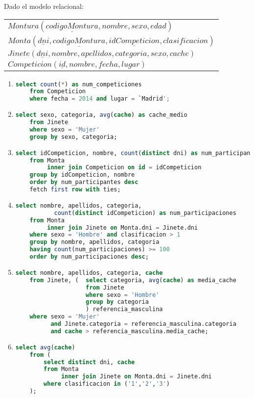 Dado el modelo relacional:
\begin{center}
	\begin{tabular}{l}
		$Montura(\underline{codigoMontura}, nombre, sexo, edad)$\\
		$Monta(\underline{dni}, \underline{codigoMontura}, \underline{idCompeticion}, clasificacion)$\\
		$Jinete(\underline{dni}, nombre, apellidos, categoria, sexo, cache)$\\
		$Competicion(\underline{id}, nombre, fecha, lugar)$\\	
	\end{tabular}
\end{center}

\begin{enumerate}
	
	\item \begin{lstlisting}[language=sql]
	select count(*) as num_competiciones
	from Competicion
	where fecha = 2014 and lugar = `Madrid';\end{lstlisting}
	
	\item \begin{lstlisting}[language=sql]
	select sexo, categoria, avg(cache) as cache_medio
	from Jinete
	where sexo = 'Mujer'
	group by sexo, categoria;\end{lstlisting}
	
	\item \begin{lstlisting}[language=sql]
	select idCompeticion, nombre, count(distinct dni) as num_participantes
	from Monta
		 inner join Competicion on id = idCompeticion
	group by idCompeticion, nombre
	order by num_participantes desc
	fetch first row with ties;\end{lstlisting}
	
	\item \begin{lstlisting}[language=sql]
	select nombre, apellidos, categoria, 
		   count(distinct idCompeticion) as num_participaciones
	from Monta
		 inner join Jinete on Monta.dni = Jinete.dni
	where sexo = 'Hombre' and clasificacion > 1
	group by nombre, apellidos, categoria
	having count(num_participaciones) >= 100
	order by num_participaciones desc;\end{lstlisting}
	
	\item \begin{lstlisting}[language=sql]
	select nombre, apellidos, categoria, cache
	from Jinete, (	select categoria, avg(cache) as media_cache
					from Jinete
					where sexo = 'Hombre'
					group by categoria
					) referencia_masculina
	where sexo = 'Mujer' 
		  and Jinete.categoria = referencia_masculina.categoria
		  and cache > referencia_masculina.media_cache;\end{lstlisting}
		  
	\item \begin{lstlisting}[language=sql]
	select avg(cache)
	from (
		select distinct dni, cache
		from Monta
			 inner join Jinete on Monta.dni = Jinete.dni
		where clasificacion in ('1','2','3')
	);\end{lstlisting}
\end{enumerate}